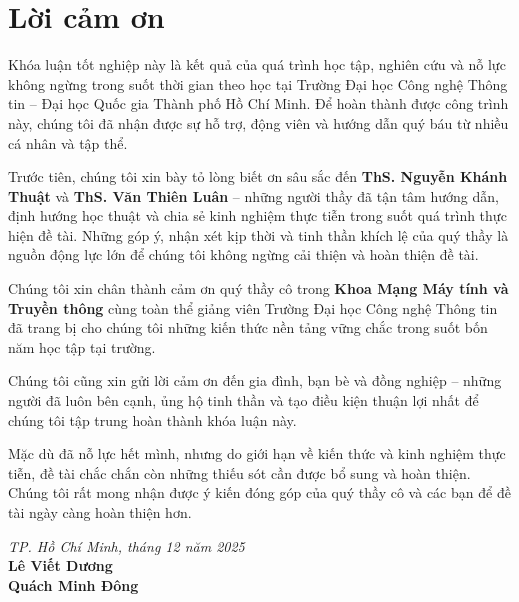 \chapter*{Lời cảm ơn}

Khóa luận tốt nghiệp này là kết quả của quá trình học tập, nghiên cứu và nỗ lực không ngừng trong suốt thời gian theo học tại Trường Đại học Công nghệ Thông tin – Đại học Quốc gia Thành phố Hồ Chí Minh. Để hoàn thành được công trình này, chúng tôi đã nhận được sự hỗ trợ, động viên và hướng dẫn quý báu từ nhiều cá nhân và tập thể.

Trước tiên, chúng tôi xin bày tỏ lòng biết ơn sâu sắc đến \textbf{ThS. Nguyễn Khánh Thuật} và \textbf{ThS. Văn Thiên Luân} – những người thầy đã tận tâm hướng dẫn, định hướng học thuật và chia sẻ kinh nghiệm thực tiễn trong suốt quá trình thực hiện đề tài. Những góp ý, nhận xét kịp thời và tinh thần khích lệ của quý thầy là nguồn động lực lớn để chúng tôi không ngừng cải thiện và hoàn thiện đề tài.

Chúng tôi xin chân thành cảm ơn quý thầy cô trong \textbf{Khoa Mạng Máy tính và Truyền thông} cùng toàn thể giảng viên Trường Đại học Công nghệ Thông tin đã trang bị cho chúng tôi những kiến thức nền tảng vững chắc trong suốt bốn năm học tập tại trường.

Chúng tôi cũng xin gửi lời cảm ơn đến gia đình, bạn bè và đồng nghiệp – những người đã luôn bên cạnh, ủng hộ tinh thần và tạo điều kiện thuận lợi nhất để chúng tôi tập trung hoàn thành khóa luận này.

Mặc dù đã nỗ lực hết mình, nhưng do giới hạn về kiến thức và kinh nghiệm thực tiễn, đề tài chắc chắn còn những thiếu sót cần được bổ sung và hoàn thiện. Chúng tôi rất mong nhận được ý kiến đóng góp của quý thầy cô và các bạn để đề tài ngày càng hoàn thiện hơn.

\vspace{2cm}
\begin{flushright}
\textit{TP. Hồ Chí Minh, tháng 12 năm 2025}\\[0.5cm]
\textbf{Lê Viết Dương} \\
\textbf{Quách Minh Đông}
\end{flushright}
